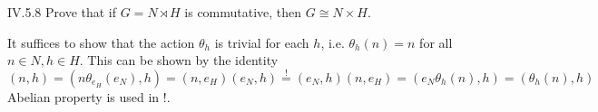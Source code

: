 \begin{problem}{IV.5.8}
Prove that if $G = N \rtimes H$ is commutative, then $G \cong N \times H$.
\end{problem}
\begin{pf}
It suffices to show that the action $\theta_h$ is trivial for each $h$, i.e. $\theta_h(n) = n$ for all $n \in N, h \in H$. This can be shown by the identity
\[
(n,h) = (n\theta_{e_H}(e_N), h) = (n,e_H)(e_N,h) \overset{!}{=} (e_N,h)(n,e_H) = (e_N\theta_h(n), h) = (\theta_h(n), h)
\]
Abelian property is used in !.
\end{pf}